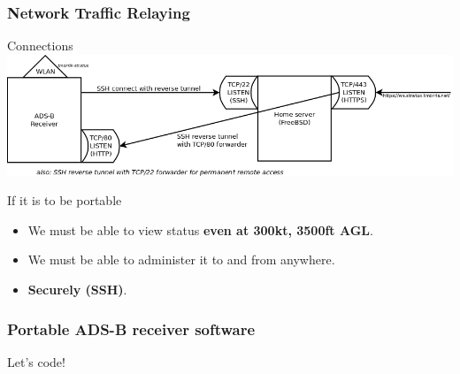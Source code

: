 \begin{frame}
\frametitle{Network Traffic Relaying}
\begin{block}{Connections}
\includegraphics[height=0.32\textheight]{image/adsb-networking.png}
\end{block}
If it is to be portable
\begin{itemize}
\item We must be able to view status \textbf{even at 300kt, 3500ft AGL}.
\item We must be able to administer it to and from anywhere.
\item \textbf{Securely (SSH)}.
\end{itemize}
\end{frame}

\begin{frame}
\frametitle{Portable ADS-B receiver software}
\begin{center}
Let's code!
\end{center}
\end{frame}
